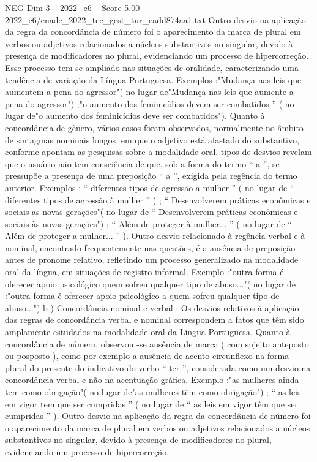 \begin{textsample}{NEG Dim 3 – 2022\_c6 – Score 5.00 – 2022\_c6/enade\_2022\_tec\_gest\_tur\_eadd874aa1.txt}
Outro desvio na aplicação da regra da concordância de número foi o aparecimento da marca de plural em verbos ou adjetivos relacionados a núcleos substantivos no singular, devido à presença de modificadores no plural, evidenciando um processo de hipercorreção.
Esse processo tem se ampliado nas situações de oralidade, caracterizando uma tendência de variação da Língua Portuguesa.
Exemplos :"Mudança nas leis que aumentem a pena do agressor"( no lugar de"Mudança nas leis que aumente a pena do agressor") ;"o aumento dos feminicídios devem ser combatidos ” ( no lugar de"o aumento dos feminicídios deve ser combatidos").
Quanto à concordância de gênero, vários casos foram observados, normalmente no âmbito de sintagmas nominais longos, em que o adjetivo está afastado do substantivo, conforme apontam as pesquisas sobre a modalidade oral. tipos de desvios revelam que o usuário não tem consciência de que, sob a forma do termo “ a ”, se pressupõe a presença de uma preposição “ a ”, exigida pela regência do termo anterior.
Exemplos : “ diferentes tipos de agressão a mulher ” ( no lugar de “ diferentes tipos de agressão à mulher ” ) ; “ Desenvolverem práticas econômicas e sociais as novas gerações"( no lugar de “ Desenvolverem práticas econômicas e sociais às novas gerações") ; “ Além de proteger à mulher... ” ( no lugar de “ Além de proteger a mulher... ” ).
Outro desvio relacionado à regência verbal e à nominal, encontrado frequentemente nas questões, é a ausência de preposição antes de pronome relativo, refletindo um processo generalizado na modalidade oral da língua, em situações de registro informal.
Exemplo :"outra forma é oferecer apoio psicológico quem sofreu qualquer tipo de abuso..."( no lugar de :"outra forma é oferecer apoio psicológico a quem sofreu qualquer tipo de abuso...") b ) Concordância nominal e verbal : Os desvios relativos à aplicação das regras de concordância verbal e nominal correspondem a fatos que têm sido amplamente estudados na modalidade oral da Língua Portuguesa.
Quanto à concordância de número, observou -se ausência de marca ( com sujeito anteposto ou posposto ), como por exemplo a ausência de acento circunflexo na forma plural do presente do indicativo do verbo “ ter ”, considerada como um desvio na concordância verbal e não na acentuação gráfica.
Exemplo :"as mulheres ainda tem como obrigação"( no lugar de"as mulheres têm como obrigação") ; “ as leis em vigor tem que ser cumpridas ” ( no lugar de “ as leis em vigor têm que ser cumpridas ” ).
Outro desvio na aplicação da regra da concordância de número foi o aparecimento da marca de plural em verbos ou adjetivos relacionados a núcleos substantivos no singular, devido à presença de modificadores no plural, evidenciando um processo de hipercorreção.

\end{textsample}
